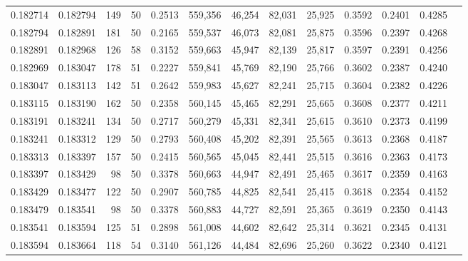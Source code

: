 \begin{tabular}{rrrrrrrrrrrrr}
0.182714 & 0.182794 &   149 &  50 &                                     0.2513 & 559,356 &  46,254 &  82,031 &  25,925 & 0.3592 & 0.2401 & 0.4285 \\
0.182794 & 0.182891 &   181 &  50 &                                     0.2165 & 559,537 &  46,073 &  82,081 &  25,875 & 0.3596 & 0.2397 & 0.4268 \\
0.182891 & 0.182968 &   126 &  58 &                                     0.3152 & 559,663 &  45,947 &  82,139 &  25,817 & 0.3597 & 0.2391 & 0.4256 \\
0.182969 & 0.183047 &   178 &  51 &                                     0.2227 & 559,841 &  45,769 &  82,190 &  25,766 & 0.3602 & 0.2387 & 0.4240 \\
0.183047 & 0.183113 &   142 &  51 &                                     0.2642 & 559,983 &  45,627 &  82,241 &  25,715 & 0.3604 & 0.2382 & 0.4226 \\
0.183115 & 0.183190 &   162 &  50 &                                     0.2358 & 560,145 &  45,465 &  82,291 &  25,665 & 0.3608 & 0.2377 & 0.4211 \\
0.183191 & 0.183241 &   134 &  50 &                                     0.2717 & 560,279 &  45,331 &  82,341 &  25,615 & 0.3610 & 0.2373 & 0.4199 \\
0.183241 & 0.183312 &   129 &  50 &                                     0.2793 & 560,408 &  45,202 &  82,391 &  25,565 & 0.3613 & 0.2368 & 0.4187 \\
0.183313 & 0.183397 &   157 &  50 &                                     0.2415 & 560,565 &  45,045 &  82,441 &  25,515 & 0.3616 & 0.2363 & 0.4173 \\
0.183397 & 0.183429 &    98 &  50 &                                     0.3378 & 560,663 &  44,947 &  82,491 &  25,465 & 0.3617 & 0.2359 & 0.4163 \\
0.183429 & 0.183477 &   122 &  50 &                                     0.2907 & 560,785 &  44,825 &  82,541 &  25,415 & 0.3618 & 0.2354 & 0.4152 \\
0.183479 & 0.183541 &    98 &  50 &                                     0.3378 & 560,883 &  44,727 &  82,591 &  25,365 & 0.3619 & 0.2350 & 0.4143 \\
0.183541 & 0.183594 &   125 &  51 &                                     0.2898 & 561,008 &  44,602 &  82,642 &  25,314 & 0.3621 & 0.2345 & 0.4131 \\
0.183594 & 0.183664 &   118 &  54 &                                     0.3140 & 561,126 &  44,484 &  82,696 &  25,260 & 0.3622 & 0.2340 & 0.4121 \\

\end{tabular}

